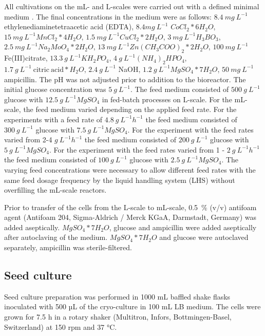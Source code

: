 \documentclass[sn-standardnature]{sn-jnl}%
\theoremstyle{thmstyleone}%
\theoremstyle{thmstyletwo}%
\theoremstyle{thmstylethree}%
\begin{document}
All cultivations on the mL- and L-scales were carried out with a defined minimal medium \cite{riesenberg1991high}.
The final concentrations in the medium were as follows:
$8.4\ mg\ L^{-1}$ ethylenediaminetetraacetic acid (EDTA), $8.4 mg\ L^{-1}$ $CoCl_{2}*6H_{2}O$, $15\ mg\ L^{-1} MnCl_{2}*4H_{2}O$, $1.5\ mg\ L^{-1} CuCl_{2}*2H_{2}O$, $3\ mg\ L^{-1} H_{3}BO_{3}$, $2.5\ mg\ L^{-1} Na_{2}MoO_{4}*2H_{2}O$, $13\ mg\ L^{-1} Zn(CH_{3}COO)_{2}*2H_{2}O$, $100\ mg\ L^{-1}$ Fe(III)citrate, $13.3\ g\ L^{-1} KH_{2}PO_{4}$, $4\ g\ L^{-1} (NH_{4})_{2}HPO_{4}$, $1.7\ g\ L^{-1}\ \mathrm{citric\ acid}*H_{2}O$, $2.4\ g\ L^{-1}$ NaOH, $1.2\ g\ L^{-1} MgSO_{4}*7H_{2}O$, $50\ mg\ L^{-1}$ ampicillin.
The pH was not adjusted prior to addition to the bioreactor.
The initial glucose concentration was $5\ g\ L^{-1}$.
The feed medium consisted of $500\ g\ L^{-1}$ glucose with $12.5\ g\ L^{-1} MgSO_{4}$ in fed-batch processes on L-scale.
For the mL-scale, the feed medium varied depending on the applied feed rate.
For the experiments with a feed rate of $4.8\ g\ L^{-1} h^{-1}$ the feed medium consisted of $300\ g\ L^{-1}$ glucose with $7.5\ g\ L^{-1} MgSO_{4}$.
For the experiment with the feed rates varied from 2-4 $g\ L^{-1}h^{-1}$ the feed medium consisted of $200\ g\ L^{-1}$ glucose with $5\ g\ L^{-1} MgSO_{4}$.
For the experiment with the feed rates varied from 1 - $2\ g\ L^{-1} h^{-1}$ the feed medium consisted of $100\ g\ L ^{-1}$ glucose with $2.5\ g\ L^{-1} MgSO_{4}$.
The varying feed concentrations were necessary to allow different feed rates with the same feed dosage frequency by the liquid handling system (LHS) without overfilling the mL-scale reactors.

Prior to transfer of the cells from the L-scale to mL-scale, 0.5~\% (v/v) antifoam agent (Antifoam 204, Sigma-Aldrich / Merck KGaA, Darmstadt, Germany) was added aseptically.
$MgSO_{4}*7H_{2}O$, glucose and ampicillin were added aseptically after autoclaving of the medium.
$MgSO_{4}*7H_{2}O$ and glucose were autoclaved separately, ampicillin was sterile-filtered.

\subsection{Seed culture}
Seed culture preparation was performed in 1000 mL baffled shake flasks inoculated with 500 µL of the cryo-culture in 100 mL LB medium.
The cells were grown for 7.5 h in a rotary shaker (Multitron, Infors, Bottmingen-Basel, Switzerland) at 150 rpm and 37 °C.
\end{document}
